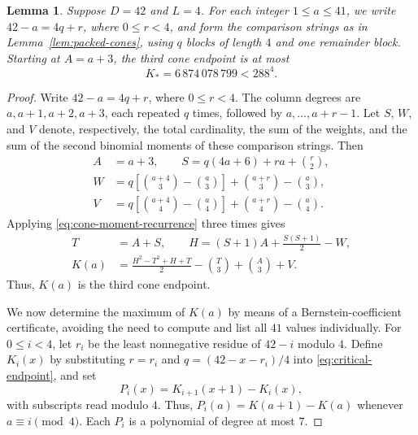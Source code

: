 \documentclass[12pt]{amsart}
\numberwithin{equation}{section}
\newtheorem{lemma}[theorem]{Lemma}
\theoremstyle{definition}
\theoremstyle{remark}
\numberwithin{equation}{section}
\begin{document}
 \begin{lemma}\label{lem:critical-cones}
	Suppose $D=42$ and $L=4$. For each integer $1\le a\le41$, we write $42-a=4q+r$, where $0\le r<4$, and form the comparison strings as in Lemma~\ref{lem:packed-cones}, using
	$q$ blocks of length $4$ and one remainder block. Starting at $A=a+3$, the third cone endpoint is at most
	\[
	K_{*}=6\,874\,078\,799<288^4.
	\]
\end{lemma}
\begin{proof}
Write $42-a=4q+r$, where $0\le r<4$. The column degrees are $a,a+1,a+2,a+3$, each repeated $q$ times, followed by $a,\ldots,a+r-1$.
Let $S$, $W$, and $V$ denote, respectively, the total cardinality, the sum of the weights, and the sum of the second binomial moments of these comparison strings.
	Then
	\[
	\begin{aligned}
		A&=a+3,\qquad S=q(4a+6)+ra+\binom r2,\\
		W&=q\left[\binom{a+4}{3}-\binom a3\right]
		+\binom{a+r}{3}-\binom a3,\\
		V&=q\left[\binom{a+4}{4}-\binom a4\right]
		+\binom{a+r}{4}-\binom a4.
	\end{aligned}
	\]
Applying \eqref{eq:cone-moment-recurrence} three times gives
	\begin{equation}\label{eq:critical-endpoint}
		\begin{aligned}
			T&=A+S,\qquad
			H=(S+1)A+\frac{S(S+1)}2-W,\\
			K(a)&=\frac{H^2-T^2+H+T}{2}-\binom T3+\binom A3+V.
		\end{aligned}
	\end{equation}
Thus, $K(a)$ is the third cone endpoint.

We now determine the maximum of $K(a)$ by means of a Bernstein-coefficient certificate, avoiding the need to compute and list all $41$ values individually.
For $0\le i<4$, let $r_i$ be the least nonnegative residue of $42-i$ modulo $4$.
Define $K_i(x)$ by substituting $r=r_i$ and $q=(42-x-r_i)/4$ into \eqref{eq:critical-endpoint}, and set
	\[
	P_i(x)=K_{i+1}(x+1)-K_i(x),
	\]
	with subscripts read modulo $4$. Thus, $P_i(a)=K(a+1)-K(a)$ whenever $a\equiv i\pmod4$. Each $P_i$ is a polynomial of degree at most $7$.



\end{proof}
\end{document}
